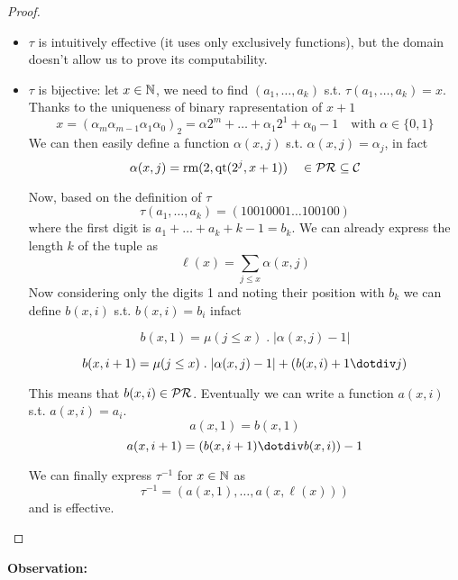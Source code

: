 \begin{lemma}
\begin{proof}
\begin{enumerate}[label=(\arabic*)]
{        \begin{itemize}
        \item $\tau$ is intuitively effective (it uses only
          exclusively functions), but the domain doesn't allow us to
          prove its computability.
        \item $\tau$ is bijective: let $x \in \mathbb{N}$, we need to find
          $(a_1, \dots, a_k)$ s.t. $\tau(a_1,\dots,a_k) = x$. Thanks
          to the uniqueness of binary rapresentation of $x+1$
          \[x = (\alpha_m \alpha_{m-1} \alpha_1 \alpha_0)_2 = \alpha
            2^m + \dots + \alpha_1 2^1 + \alpha_0 - 1 \quad \text{with
            } \alpha \in \{0,1\} \] We can then easily define a
          function $\alpha(x,j)$ s.t. $\alpha(x,j) = \alpha_j$, in
          fact
          \[\alpha(x, j) = \text{rm}(2, \text{qt}(2^j, x+1)) \quad \in
            \mathcal{PR} \subseteq \mathcal{C}\]

          Now, based on the definition of $\tau$
          \[\tau(a_1, \dots, a_k) = (1 0 0 1 0 0 0 1 \dots 1 0 0 1 0
            0)\] where the first digit is $a_1+\dots+a_k+k-1 =
          b_k$. We can already express the length $k$ of the tuple
          as \[\ell (x) = \sum_{j \leq x}\alpha(x,j)\] Now considering
          only the digits 1 and noting their position with $b_k$ we
          can define $b(x,i)$ s.t. $b(x,i) = b_i$ infact
          
          \[b(x,1) = \mu(j \leq x) \; . \; |\alpha(x,j) - 1|\]
          
          \[b(x,i+1) = \mu(j \leq x) \; . \; |\alpha(x,j)-1| +
            (b(x,i)+1 \dotdiv j)\]

          This means that $b(x,i)\in \mathcal{PR}$.  Eventually we can write a
          function $a(x,i)$ s.t. $a(x,i) = a_i$.
          \[a(x,1) = b(x,1)\]
          \[a(x,i+1) = (b(x,i+1) \dotdiv b(x,i))-1\]

          We can finally express $\tau^{-1}$ for $x \in \mathbb{N}$ as
          \[\tau^{-1} = (a(x,1), \dots, a(x, \ell(x)))\] and is
          effective.
        \end{itemize}
      }
    \end{enumerate}
  \end{proof}
\end{lemma}

\textbf{Observation:} 

